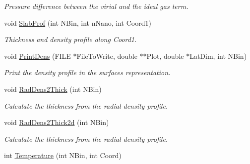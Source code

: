 \begin{DoxyCompactItemize}
\begin{DoxyCompactList}\small\item\em Pressure difference between the virial and the ideal gas term. \end{DoxyCompactList}\item 
void \hyperlink{classElPoly_a3db31f8490f0ea101281679a270e72fe}{Slab\+Prof} (int N\+Bin, int n\+Nano, int Coord1)
\begin{DoxyCompactList}\small\item\em Thickness and density profile along Coord1. \end{DoxyCompactList}\item 
void \hyperlink{classElPoly_a6591e29bd7876dc9dc255808d04499f9}{Print\+Dens} (F\+I\+LE $\ast$File\+To\+Write, double $\ast$$\ast$Plot, double $\ast$Lat\+Dim, int N\+Bin)
\begin{DoxyCompactList}\small\item\em Print the density profile in the surfaces representation. \end{DoxyCompactList}\item 
void \hyperlink{classElPoly_a7c40fb501bdadab09ee7cf8d99259299}{Rad\+Dens2\+Thick} (int N\+Bin)
\begin{DoxyCompactList}\small\item\em Calculate the thickness from the radial density profile. \end{DoxyCompactList}\item 
void \hyperlink{classElPoly_ad5ab39cdaa856caea3463819b436e7b9}{Rad\+Dens2\+Thick2d} (int N\+Bin)
\begin{DoxyCompactList}\small\item\em Calculate the thickness from the radial density profile. \end{DoxyCompactList}\item 
int \hyperlink{classElPoly_ad0651bcc7574507f16c1998b57822bdd}{Temperature} (int N\+Bin, int Coord)\hypertarget{classElPoly_ad0651bcc7574507f16c1998b57822bdd}{}\label{classElPoly_ad0651bcc7574507f16c1998b57822bdd}


\end{DoxyCompactItemize}
